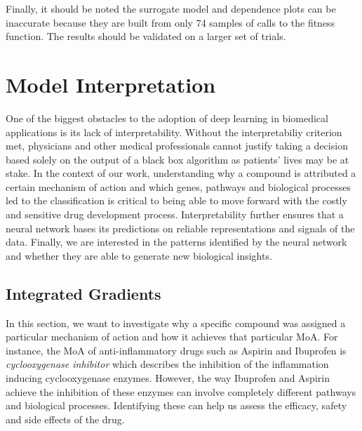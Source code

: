 \documentclass[bsc,frontabs,twoside,singlespacing,parskip,deptreport]{infthesis}     %
\let\Oldsection\section
\renewcommand{\section}{\FloatBarrier\Oldsection}
\begin{document}
Finally, it should be noted the surrogate model and dependence plots can be inaccurate because they are built from only 74 samples of calls to the fitness function. The results should be validated on a larger set of trials.


\chapter{Model Interpretation}
One of the biggest obstacles to the adoption of deep learning in biomedical applications is its lack of interpretability. Without the interpretabiliy criterion met, physicians and other medical professionals cannot justify taking a decision based solely on the output of a black box algorithm as patients' lives may be at stake. In the context of our work, understanding why a compound is attributed a certain mechanism of action and which genes, pathways and biological processes led to the classification is critical to being able to move forward with the costly and sensitive drug development process. Interpretability further ensures that a neural network bases its predictions on reliable representations and signals of the data. Finally, we are interested in the patterns identified by the neural network and whether they are able to generate new biological insights.

\section{Integrated Gradients}
In this section, we want to investigate why a specific compound was assigned a particular mechanism of action and how it achieves that particular MoA.
For instance, the MoA of anti-inflammatory drugs such as Aspirin and Ibuprofen is \textit{cyclooxygenase inhibitor} which describes the inhibition of the inflammation inducing cyclooxygenase enzymes. However, the way Ibuprofen and Aspirin achieve the inhibition of these enzymes can involve completely different pathways and biological processes. Identifying these can help us assess the efficacy, safety and side effects of the drug.
\end{document}
